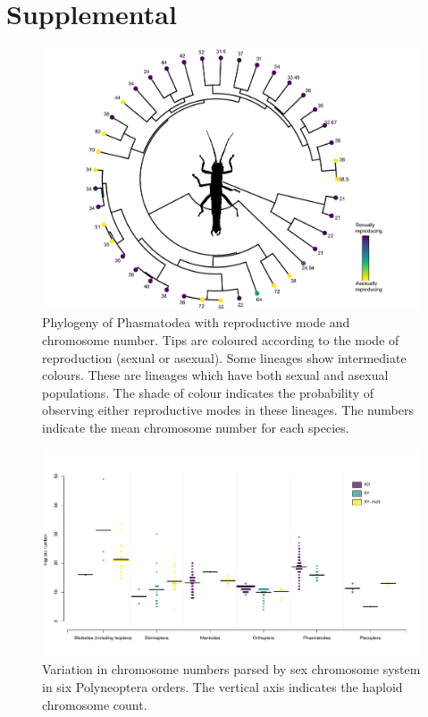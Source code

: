 \section{Supplemental}
\setcounter{figure}{0}
\renewcommand{\thefigure}{S\arabic{figure}}
\setcounter{table}{0}
\renewcommand{\thetable}{S\arabic{table}}

\begin{figure}[!ht]
\centering \includegraphics[width=1\textwidth]{figures/phasmatodea_phylogeny.pdf}
\caption{Phylogeny of Phasmatodea with reproductive mode and chromosome number. Tips are coloured according to the mode of reproduction (sexual or asexual). Some lineages show intermediate colours. These are lineages which have both sexual and asexual populations. The shade of colour indicates the probability of observing either reproductive modes in these lineages. The numbers indicate the mean chromosome number for each species.}
\label{fig:phas.phylo}
\end{figure}

\begin{figure}
\centering \includegraphics[width=1\textwidth]{figures/Preliminary_data.pdf}
\caption{
Variation in chromosome numbers parsed by sex chromosome system in six Polyneoptera orders. The vertical axis indicates the haploid chromosome count.
}
\label{fig:order.plots}
\end{figure}


